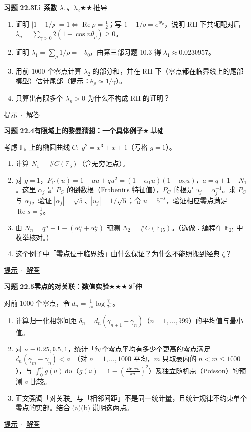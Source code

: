 \documentclass[11pt,a4paper]{article}
\newcommand{\dd}{\,\mathrm{d}}
\renewcommand{\Re}{\operatorname{Re}}
\newcommand{\lvI}{$\bigstar$\,基础}
\newcommand{\lvII}{$\bigstar\bigstar$\,推导}
\newcommand{\lvIII}{$\bigstar\bigstar\bigstar$\,延伸}
\newcommand{\Q}[3]{%
  \par\addvspace{1.1em}\noindent
  \hypertarget{q:#1}{}\textbf{习题 #1}\quad\textbf{#3}\hfill{\small #2}\par
  \nopagebreak\smallskip}
\newcommand{\toHint}[1]{\hfill{\small\hyperlink{h:#1}{提示}\ $\cdot$\ \hyperlink{s:#1}{解答}}}
\begin{document}
\Q{22.3}{\lvII}{Li 系数 $\lambda_1$、$\lambda_2$}
\begin{enumerate}
  \item 证明 $|1-1/\rho|=1\iff\Re\rho=\frac12$；写 $1-1/\rho=e^{i\theta_\rho}$，说明 RH 下共轭配对后 $\lambda_n=\sum_{\gamma>0}2(1-\cos n\theta_\rho)\ge0$。
  \item 证明 $\lambda_1=\sum_\rho1/\rho=-b_0$，由第三部习题 10.3 得 $\lambda_1\approx0.0230957$。
  \item 用前 $1000$ 个零点计算 $\lambda_2$ 的部分和，并在 RH 下（零点都在临界线上的尾部模型）估计尾部（提示：$\theta_\rho\approx1/\gamma$）。
  \item 只算出有限多个 $\lambda_n>0$ 为什么不构成 RH 的证明？
\end{enumerate}
\toHint{22.3}

\Q{22.4}{\lvI}{有限域上的黎曼猜想：一个具体例子}
考虑 $\mathbb F_5$ 上的椭圆曲线 $C:\ y^2=x^3+x+1$（亏格 $g=1$）。
\begin{enumerate}
  \item 计算 $N_1=\#C(\mathbb F_5)$（含无穷远点）。
  \item 对 $g=1$，$P_C(u)=1-au+qu^2=(1-\alpha_1u)(1-\alpha_2u)$，$a=q+1-N_1$。这里 $\alpha_j$ 是 $P_C$ 的倒数根（Frobenius 特征值），$P_C$ 的根是 $u_j=\alpha_j^{-1}$。求 $P_C$ 与 $\alpha_j$，验证 $|\alpha_j|=\sqrt5$、$|u_j|=1/\sqrt5$；令 $u=5^{-s}$，验证相应零点满足 $\Re s=\frac12$。
  \item 由 $N_n=q^n+1-(\alpha_1^n+\alpha_2^n)$ 预测 $N_2=\#C(\mathbb F_{25})$。（选做：编程在 $\mathbb F_{25}$ 中枚举核对。）
  \item 这个例子中「零点位于临界线」由什么保证？为什么不能照搬到经典 $\zeta$？
\end{enumerate}
\toHint{22.4}

\Q{22.5}{\lvIII}{零点的对关联：数值实验}
对前 $1000$ 个零点，令 $d_n=\frac1{2\pi}\log\frac{\gamma_n}{2\pi}$。
\begin{enumerate}
  \item 计算归一化相邻间距 $\delta_n=d_n(\gamma_{n+1}-\gamma_n)$（$n=1,\dots,999$）的平均值与最小值。
  \item 对 $a=0.25,0.5,1$，统计「每个零点平均有多少个更高的零点满足 $d_n(\gamma_m-\gamma_n)<a$」（对 $n=1,\dots,1000$ 平均，$m$ 只取表内的 $n<m\le1000$），与 $\int_0^ag(u)\dd u$（$g(u)=1-(\frac{\sin\pi u}{\pi u})^2$）及独立随机点（Poisson）的预测 $a$ 比较。
  \item 正文强调「对关联」与「相邻间距」不是同一统计量，且统计规律不约束单个零点的实部。结合 (a)(b) 说明这两点。
\end{enumerate}
\toHint{22.5}
\end{document}
